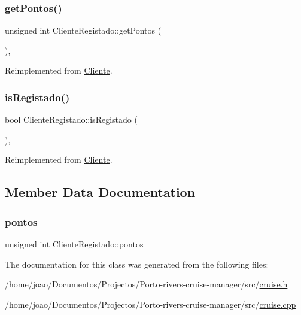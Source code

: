 \subsubsection{\texorpdfstring{get\+Pontos()}{getPontos()}}
{\footnotesize\ttfamily unsigned int Cliente\+Registado\+::get\+Pontos (\begin{DoxyParamCaption}{ }\end{DoxyParamCaption})\hspace{0.3cm}{\ttfamily [inline]}, {\ttfamily [virtual]}}



Reimplemented from \hyperlink{classCliente_a4bcd51f0d9a0bfe7d9d47074ac4e65de}{Cliente}.

\mbox{\label{classClienteRegistado_a3dade20423acb0e84c9fbe30c75f0e3e}} 
\subsubsection{\texorpdfstring{is\+Registado()}{isRegistado()}}
{\footnotesize\ttfamily bool Cliente\+Registado\+::is\+Registado (\begin{DoxyParamCaption}{ }\end{DoxyParamCaption})\hspace{0.3cm}{\ttfamily [inline]}, {\ttfamily [virtual]}}



Reimplemented from \hyperlink{classCliente_acb60d8bf04134b986ae56a79db8beaaf}{Cliente}.



\subsection{Member Data Documentation}
\mbox{\label{classClienteRegistado_a137b6b72d824b38eabcfcb78671dd495}} 
\subsubsection{\texorpdfstring{pontos}{pontos}}
{\footnotesize\ttfamily unsigned int Cliente\+Registado\+::pontos\hspace{0.3cm}{\ttfamily [private]}}



The documentation for this class was generated from the following files\+:\begin{DoxyCompactItemize}
\item 
/home/joao/\+Documentos/\+Projectos/\+Porto-\/rivers-\/cruise-\/manager/src/\hyperlink{cruise_8h}{cruise.\+h}\item 
/home/joao/\+Documentos/\+Projectos/\+Porto-\/rivers-\/cruise-\/manager/src/\hyperlink{cruise_8cpp}{cruise.\+cpp}\end{DoxyCompactItemize}
